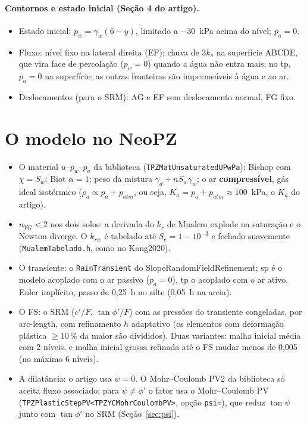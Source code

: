 \documentclass[11pt,a4paper]{article}
\begin{document}
\paragraph{Contornos e estado inicial (Seção 4 do artigo).}
\begin{itemize}
  \item Estado inicial: $p_w = \gamma_w(6 - y)$, limitado a $-30$~kPa acima do nível; $p_a = 0$.
  \item Fluxo: nível fixo na lateral direita (EF); chuva de $3k_s$ na superfície ABCDE, que vira face de percolação
    ($p_w = 0$) quando a água não entra mais; no tp, $p_a = 0$ na superfície; as outras fronteiras são impermeáveis à
    água e ao ar.
  \item Deslocamentos (para o SRM): AG e EF sem deslocamento normal, FG fixo.
\end{itemize}

\section{O modelo no NeoPZ}
\begin{itemize}
  \item O material $u$--$p_w$--$p_a$ da biblioteca (\texttt{TPZMatUnsaturatedUPwPa}): Bishop com $\chi = S_w$; Biot
    $\alpha = 1$; peso da mistura $\gamma_d + n S_w \gamma_w$; o ar \textbf{compressível}, gás ideal isotérmico
    ($\rho_a \propto p_a + p_{atm}$, ou seja, $K_a = p_a + p_{atm} \approx 100$~kPa, o $K_a$ do artigo).
  \item $n_{VG} < 2$ nos dois solos: a derivada do $k_r$ de Mualem explode na saturação e o Newton diverge. O $k_{rw}$
    é tabelado até $S_e = 1 - 10^{-3}$ e fechado suavemente (\texttt{MualemTabelado.h}, como no Kang2020).
  \item O transiente: o \texttt{RainTransient} do SlopeRandomFieldRefinement; sp é o modelo acoplado com o ar passivo
    ($p_a = 0$), tp o acoplado com o ar ativo. Euler implícito, passo de 0,25~h no silte (0,05~h na areia).
  \item O FS: o SRM ($c'/F$, $\tan\phi'/F$) com as pressões do transiente congeladas, por arc-length, com refinamento
    $h$ adaptativo (os elementos com deformação plástica $\geq 10\,\%$ da maior são divididos). Duas variantes: malha
    inicial média com 2 níveis, e malha inicial grossa refinada até o FS mudar menos de 0,005 (no máximo 6 níveis).
  \item A dilatância: o artigo usa $\psi = 0$. O Mohr--Coulomb PV2 da biblioteca só aceita fluxo associado; para
    $\psi \neq \phi'$ o fator usa o Mohr--Coulomb PV (\texttt{TPZPlasticStepPV<TPZYCMohrCoulombPV>}, opção
    \texttt{psi=}), que reduz $\tan\psi$ junto com $\tan\phi'$ no SRM (Seção~\ref{sec:psi}).
\end{itemize}
\end{document}
